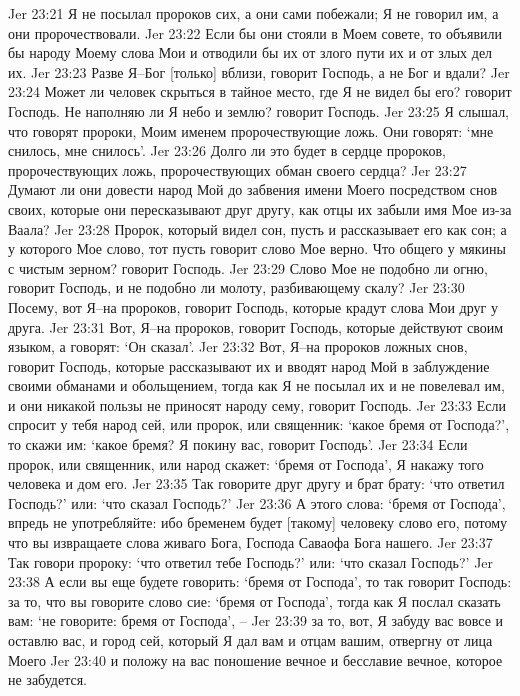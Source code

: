 Jer 23:21  Я не посылал пророков сих, а они сами побежали; Я не говорил им, а они пророчествовали.
Jer 23:22  Если бы они стояли в Моем совете, то объявили бы народу Моему слова Мои и отводили бы их от злого пути их и от злых дел их.
Jer 23:23  Разве Я--Бог [только] вблизи, говорит Господь, а не Бог и вдали?
Jer 23:24  Может ли человек скрыться в тайное место, где Я не видел бы его? говорит Господь. Не наполняю ли Я небо и землю? говорит Господь.
Jer 23:25  Я слышал, что говорят пророки, Моим именем пророчествующие ложь. Они говорят: `мне снилось, мне снилось'.
Jer 23:26  Долго ли это будет в сердце пророков, пророчествующих ложь, пророчествующих обман своего сердца?
Jer 23:27  Думают ли они довести народ Мой до забвения имени Моего посредством снов своих, которые они пересказывают друг другу, как отцы их забыли имя Мое из-за Ваала?
Jer 23:28  Пророк, который видел сон, пусть и рассказывает его как сон; а у которого Мое слово, тот пусть говорит слово Мое верно. Что общего у мякины с чистым зерном? говорит Господь.
Jer 23:29  Слово Мое не подобно ли огню, говорит Господь, и не подобно ли молоту, разбивающему скалу?
Jer 23:30  Посему, вот Я--на пророков, говорит Господь, которые крадут слова Мои друг у друга.
Jer 23:31  Вот, Я--на пророков, говорит Господь, которые действуют своим языком, а говорят: `Он сказал'.
Jer 23:32  Вот, Я--на пророков ложных снов, говорит Господь, которые рассказывают их и вводят народ Мой в заблуждение своими обманами и обольщением, тогда как Я не посылал их и не повелевал им, и они никакой пользы не приносят народу сему, говорит Господь.
Jer 23:33  Если спросит у тебя народ сей, или пророк, или священник: `какое бремя от Господа?', то скажи им: `какое бремя? Я покину вас, говорит Господь'.
Jer 23:34  Если пророк, или священник, или народ скажет: `бремя от Господа', Я накажу того человека и дом его.
Jer 23:35  Так говорите друг другу и брат брату: `что ответил Господь?' или: `что сказал Господь?'
Jer 23:36  А этого слова: `бремя от Господа', впредь не употребляйте: ибо бременем будет [такому] человеку слово его, потому что вы извращаете слова живаго Бога, Господа Саваофа Бога нашего.
Jer 23:37  Так говори пророку: `что ответил тебе Господь?' или: `что сказал Господь?'
Jer 23:38  А если вы еще будете говорить: `бремя от Господа', то так говорит Господь: за то, что вы говорите слово сие: `бремя от Господа', тогда как Я послал сказать вам: `не говорите: бремя от Господа', --
Jer 23:39  за то, вот, Я забуду вас вовсе и оставлю вас, и город сей, который Я дал вам и отцам вашим, отвергну от лица Моего
Jer 23:40  и положу на вас поношение вечное и бесславие вечное, которое не забудется.

